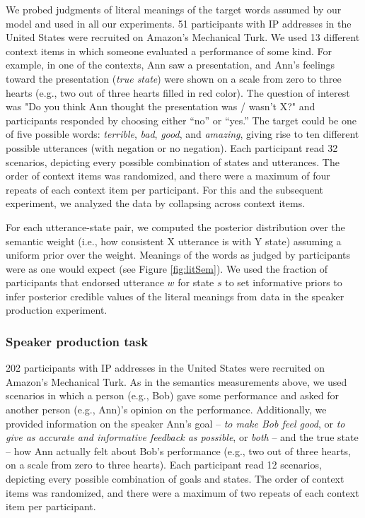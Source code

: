 \documentclass[12pt]{article}
\begin{document}
We probed judgments of literal meanings of the target words assumed by our model and used in all our experiments. 
51 participants with IP addresses in the United States were recruited on Amazon's Mechanical Turk. 
We used 13 different context items in which someone evaluated a performance of some kind. 
For example, in one of the contexts, Ann saw a presentation, and Ann's feelings toward the presentation (\emph{true state}) were shown on a scale from zero to three hearts 
(e.g., two out of three hearts filled in red color). 
The question of interest was "Do you think Ann thought the presentation was / wasn't X?" and participants responded by choosing either \enquote{no} or \enquote{yes.}  
The target could be one of five possible words: \emph{terrible}, \emph{bad}, \emph{good}, and \emph{amazing}, giving rise to ten different possible utterances (with negation or no negation). 
Each participant read 32 scenarios, depicting every possible combination of states and utterances. 
The order of context items was randomized, and there were a maximum of four repeats of each context item per participant. 
For this and the subsequent experiment, we analyzed the data by collapsing across context items. 

For each utterance-state pair, we computed the posterior distribution over the semantic weight 
(i.e., how consistent X utterance is with Y state) assuming a uniform prior over the weight.
Meanings of the words as judged by participants were as one would expect (see Figure \ref{fig:litSem}). 
We used the fraction of participants that endorsed utterance $w$ for state $s$ to set informative priors to infer posterior credible values of the literal meanings from data in the speaker production experiment.

\subsubsection*{Speaker production task}

202 participants with IP addresses in the United States were recruited on Amazon's Mechanical Turk.
As in the semantics measurements above, we used scenarios in which a person (e.g., Bob) gave some performance and asked for another person (e.g., Ann)'s opinion on the performance. 
Additionally, we provided information on the speaker Ann's goal -- \emph{to make Bob feel good}, or \emph{to give as accurate and informative feedback as possible}, or \emph{both} -- 
and the true state -- how Ann actually felt about Bob's performance (e.g., two out of three hearts, on a scale from zero to three hearts). 
Each participant read 12 scenarios, depicting every possible combination of goals and states. 
The order of context items was randomized, and there were a maximum of two repeats of each context item per participant.
\end{document}
